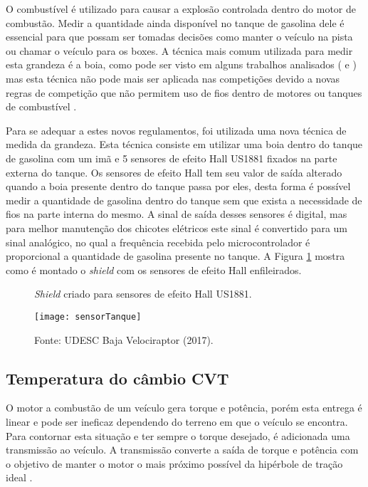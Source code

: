 O combustível é utilizado para causar a explosão controlada dentro do motor de combustão. Medir a quantidade ainda disponível no tanque de gasolina dele é essencial para que possam ser tomadas decisões como manter o veículo na pista ou chamar o veículo para os boxes. A técnica mais comum utilizada para medir esta grandeza é a boia, como pode ser visto em alguns trabalhos analisados (\cite{Nunes2016} e \cite{projetoMiniBaja2006}) mas esta técnica não pode mais ser aplicada nas competições devido a novas regras de competição que não permitem uso de fios dentro de motores ou tanques de combustível \cite{regulamentobajasae}. 

Para se adequar a estes novos regulamentos, foi utilizada uma nova técnica de medida da grandeza. Esta técnica consiste em utilizar uma boia dentro do tanque de gasolina com um imã e 5 sensores de efeito Hall US1881 fixados na parte externa do tanque. Os sensores de efeito Hall tem seu valor de saída alterado quando a boia presente dentro do tanque passa por eles, desta forma é possível medir a quantidade de gasolina dentro do tanque sem que exista a necessidade de fios na parte interna do mesmo. A sinal de saída desses sensores é digital, mas para melhor manutenção dos chicotes elétricos este sinal é convertido para um sinal analógico, no qual a frequência recebida pelo microcontrolador é proporcional a quantidade de gasolina presente no tanque. A Figura \ref{fig:sensorTanque} mostra como é montado o \textit{shield} com os sensores de efeito Hall enfileirados.  

\begin{figure}[!htb]
	\centering
		\caption{\textit{Shield} criado para sensores de efeito Hall US1881.}
		\texttt{[image: sensorTanque]} 
		\caption*{Fonte: UDESC Baja Velociraptor (2017).}
		\label{fig:sensorTanque}
\end{figure} 


\subsection{Temperatura do câmbio CVT}

O motor a combustão de um veículo gera torque e potência, porém esta entrega é linear e pode ser ineficaz dependendo do terreno em que o veículo se encontra. Para contornar esta situação e ter sempre o torque desejado, é adicionada uma transmissão ao veículo. A transmissão converte a saída de torque e potência com o objetivo de manter o motor o mais próximo possível da hipérbole de tração ideal \cite{Naunheimer2011}. 

